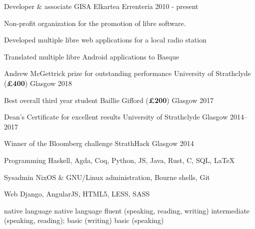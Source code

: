 \documentclass[11pt, a4paper]{awesome-cv}
\begin{document}
\begin{cventries}
    \cventry
      {Developer \& associate} %
      {GISA Elkartea}
      {Errenteria} %
      {2010 - present} %
      {
        Non-profit organization for the promotion of libre
        software.\vspace{1.1\baselineskip}
        \begin{cvitems} %
          \item {Developed multiple libre web applications for a local radio
              station}
          \item {Translated multiple libre Android applications to Basque}
        \end{cvitems}
      }

\end{cventries}


\begin{cvhonors}
  
    \cvhonor
      {Andrew McGettrick prize for outstanding performance} %
      {University of Strathclyde (\textbf{£400})} %
      {Glasgow} %
      {2018} %
  
    \cvhonor
      {Best overall third year student} %
      {Baillie Gifford (\textbf{£200})} %
      {Glasgow} %
      {2017} %
  
    \cvhonor
      {Dean's Certificate for excellent results} %
      {University of Strathclyde} %
      {Glasgow} %
      {2014--2017} %
  
    \cvhonor
      {Winner of the Bloomberg challenge} %
      {StrathHack} %
      {Glasgow} %
      {2014} %
\end{cvhonors}

\noindent
\begin{minipage}[t]{0.55\linewidth}
\vspace{0.21\baselineskip}
\begin{cvskills}
    \cvskill
      {Programming} %
      {Haskell, Agda, Coq, Python, JS, Java, Rust, C, SQL, LaTeX} %
  
    \cvskill
      {Sysadmin} %
      {NixOS \& GNU/Linux administration, Bourne shells, Git} %
  
    \cvskill
      {Web} %
      {Django, AngularJS, HTML5, LESS, SASS} %
\end{cvskills}
\end{minipage}%
\hspace{0.05\linewidth}
\begin{minipage}[t]{0.4\linewidth}
\begin{cvskills}
     {native language}
     {native language}
     {fluent (speaking, reading, writing)}
     {
        intermediate (speaking, reading);\newline
        basic (writing)}
     {basic (speaking)}
\end{cvskills}
\end{minipage}
\end{document}

